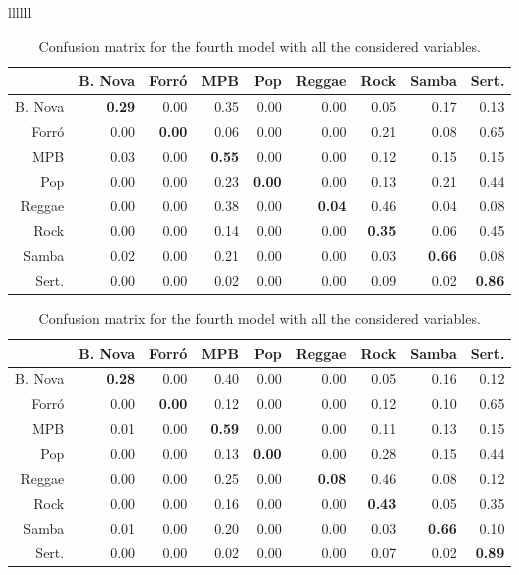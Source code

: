 \documentclass[twocolumn]{article}
\begin{document}
\begin{table}[ht]
\begin{tabular}{llllll}
\begin{table}[ht]
\caption{Confusion matrix for third model with the first, second and third sets of variables.}
\small
\vspace{3mm}
 \setlength\tabcolsep{1.5pt}
\centering
\begin{tabular}{rrrrrrrrr}
 & B. Nova & Forró & MPB & Pop & Reggae & Rock & Samba & Sert. \\ 
  \hline
B. Nova  & \textbf{0.29} & 0.00 & 0.35 & 0.00 & 0.00 & 0.05 & 0.17 & 0.13 \\ 
  Forró     & 0.00 & \textbf{0.00} & 0.06 & 0.00 & 0.00 & 0.21 & 0.08 & 0.65 \\ 
  MPB       & 0.03 & 0.00 & \textbf{0.55} & 0.00 & 0.00 & 0.12 & 0.15 & 0.15 \\ 
  Pop       & 0.00 & 0.00 & 0.23 & \textbf{0.00} & 0.00 & 0.13 & 0.21 & 0.44 \\ 
  Reggae    & 0.00 & 0.00 & 0.38 & 0.00 & \textbf{0.04} & 0.46 & 0.04 & 0.08 \\ 
  Rock      & 0.00 & 0.00 & 0.14 & 0.00 & 0.00 & \textbf{0.35} & 0.06 & 0.45 \\ 
  Samba     & 0.02 & 0.00 & 0.21 & 0.00 & 0.00 & 0.03 & \textbf{0.66} & 0.08 \\ 
  Sert. & 0.00 & 0.00 & 0.02 & 0.00 & 0.00 & 0.09 & 0.02 & \textbf{0.86} \\ 
     \hline
\end{tabular}
\label{tab:conf_3}
\end{table}
 


\begin{table}[ht]
\caption{Confusion matrix for the fourth model with all the considered variables.}
\small
\vspace{3mm}
 \setlength\tabcolsep{1.5pt}
\centering
\begin{tabular}{rrrrrrrrr}
 & B. Nova & Forró & MPB & Pop & Reggae & Rock & Samba & Sert. \\ 
  \hline
B. Nova  & \textbf{0.28} & 0.00 & 0.40 & 0.00 & 0.00 & 0.05 & 0.16 & 0.12 \\ 
  Forró     & 0.00 & \textbf{0.00} & 0.12 & 0.00 & 0.00 & 0.12 & 0.10 & 0.65 \\ 
  MPB       & 0.01 & 0.00 & \textbf{0.59} & 0.00 & 0.00 & 0.11 & 0.13 & 0.15 \\ 
  Pop       & 0.00 & 0.00 & 0.13 & \textbf{0.00} & 0.00 & 0.28 & 0.15 & 0.44 \\ 
  Reggae    & 0.00 & 0.00 & 0.25 & 0.00 & \textbf{0.08} & 0.46 & 0.08 & 0.12 \\ 
  Rock      & 0.00 & 0.00 & 0.16 & 0.00 & 0.00 & \textbf{0.43} & 0.05 & 0.35 \\ 
  Samba     & 0.01 & 0.00 & 0.20 & 0.00 & 0.00 & 0.03 & \textbf{0.66} & 0.10 \\ 
  Sert. & 0.00 & 0.00 & 0.02 & 0.00 & 0.00 & 0.07 & 0.02 & \textbf{0.89} \\


\end{tabular}
\end{table}
\end{tabular}
\end{table}
\end{document}
